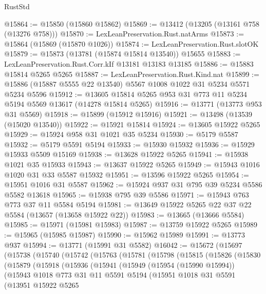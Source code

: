\begin{lexlean}{RustStd}
\begin{coremodule}
@15864 := @15850 (@15860 @15862)
@15869 := @13412 (@13205 (@13161 @758 (@13276 @758)))
@15870 := LexLeanPreservation.Rust.natArms
@15873 := @15864 (@15869 (@15870 @1026))
@15874 := LexLeanPreservation.Rust.slotOK
@15879 := @15873 (@13781 (@15874 @15814 @13540)) @15655
@15883 := LexLeanPreservation.Rust.Corr.kIf @13181 @13183 @13185
@15886 := @15883 @15814 @5265 @5265
@15887 := LexLeanPreservation.Rust.Kind.nat
@15899 := @15886 (@15887 @5555 @22 @13540) @5567 @1008 @1022 @31 @5234 @5571 @5234 @5596
@15912 := @13605 @15814 @5265 @953 @31 @773 @11 @5234 @5194 @5569 @13617 (@14278 @15814 @5265)
@15916 := @13771 (@13773 @953 @31 @5569)
@15918 := @15899 (@15912 @15916)
@15921 := @13498 (@13539 (@15020 @13540))
@15922 := @15921 @15814
@15924 := @13605 @15922 @5265
@15929 := @15924 @958 @31 @1021 @35 @5234
@15930 := @5179 @5587
@15932 := @5179 @5591 @5194
@15933 := @15930 @15932
@15936 := @15929 @15933 @5509 @15169
@15938 := @13628 @15922 @5265
@15941 := @15938 @1021 @35 @15933
@15943 := @13637 @15922 @5265
@15949 := @15943 @1016 @1020 @31 @33 @5587 @15932
@15951 := @13596 @15922 @5265
@15954 := @15951 @1016 @31 @5587
@15962 := @15924 @937 @31 @795 @39 @5234 @5586 @5582 @13618
@15965 := @15938 @795 @39 @5586
@15971 := @15943 @763 @773 @37 @11 @5584 @5194
@15981 := @13649 @15922 @5265 @22 @37 @22 @5584 (@13657 (@13658 @15922 @22))
@15983 := @13665 (@13666 @5584)
@15985 := @15971 (@15981 @15983)
@15987 := @13759 @15922 @5265
@15989 := @15965 (@15985 @15987)
@15990 := @15962 @15989
@15991 := @13773 @937
@15994 := @13771 (@15991 @31 @5582)
@16042 := @15672
    (@15697
      (@15738
        (@15740
          (@15742
            (@15763
              (@15781
                (@15798
                  (@15815
                    (@15826
                      (@15830
                        (@15879
                          (@15918
                            (@15936
                              (@15941
                                (@15949
                                  (@15954 (@15990 @15994))
                                  (@15943
                                    @1018
                                    @773
                                    @31
                                    @11
                                    @5591
                                    @5194
                                    (@15951
                                      @1018
                                      @31
                                      @5591
                                      (@13951
                                        @15922
                                        @5265

\end{coremodule}
\end{lexlean}
